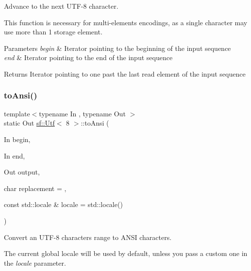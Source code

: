 Advance to the next U\+T\+F-\/8 character. 

This function is necessary for multi-\/elements encodings, as a single character may use more than 1 storage element.


\begin{DoxyParams}{Parameters}
{\em begin} & Iterator pointing to the beginning of the input sequence \\
\hline
{\em end} & Iterator pointing to the end of the input sequence\\
\hline
\end{DoxyParams}
\begin{DoxyReturn}{Returns}
Iterator pointing to one past the last read element of the input sequence \begin{DoxyVerb}\end{DoxyVerb}
 
\end{DoxyReturn}
\mbox{\label{classsf_1_1_utf_3_018_01_4_a3d8b02f29021bd48831e7706d826f0c5}} 
\subsubsection{\texorpdfstring{toAnsi()}{toAnsi()}}
{\footnotesize\ttfamily template$<$typename In , typename Out $>$ \\
static Out \mbox{\hyperlink{classsf_1_1_utf}{sf\+::\+Utf}}$<$ 8 $>$\+::to\+Ansi (\begin{DoxyParamCaption}\item[{In}]{begin,  }\item[{In}]{end,  }\item[{Out}]{output,  }\item[{char}]{replacement = {},  }\item[{const std\+::locale \&}]{locale = {\ttfamily std\+:\+:locale()} }\end{DoxyParamCaption})\hspace{0.3cm}{\ttfamily [static]}}



Convert an U\+T\+F-\/8 characters range to A\+N\+SI characters. 

The current global locale will be used by default, unless you pass a custom one in the {\itshape locale} parameter.


